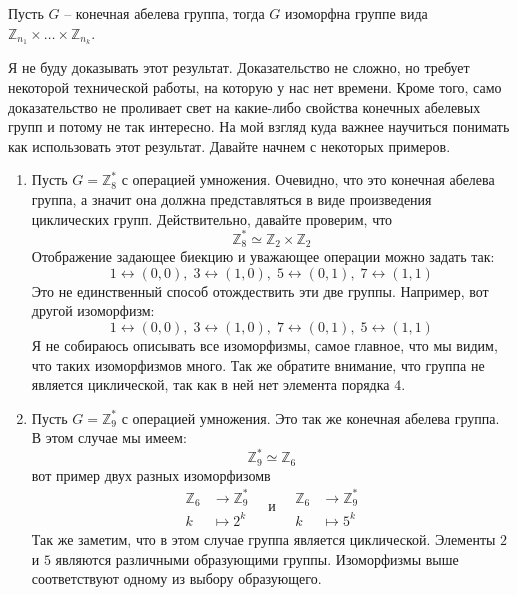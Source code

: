 \begin{claim}
\label{claim::FAGStruct}
Пусть $G$ -- конечная абелева группа, тогда $G$ изоморфна группе вида $\mathbb Z_{n_1}\times \ldots \times \mathbb Z_{n_k}$.
\end{claim}

Я не буду доказывать этот результат.
Доказательство не сложно, но требует некоторой технической работы, на которую у нас нет времени.
Кроме того, само доказательство не проливает свет на какие-либо свойства конечных абелевых групп и потому не так интересно.
На мой взгляд куда важнее научиться понимать как использовать этот результат.
Давайте начнем с некоторых примеров.

\begin{examples}
\begin{enumerate}
\item Пусть $G = \mathbb Z_8^*$ с операцией умножения.
Очевидно, что это конечная абелева группа, а значит она должна представляться в виде произведения циклических групп.
Действительно, давайте проверим, что
\[
\mathbb Z_8^* \simeq \mathbb Z_2\times \mathbb Z_2
\]
Отображение задающее биекцию и уважающее операции можно задать так:
\[
1 \leftrightarrow (0,0),\; 3 \leftrightarrow (1,0),\; 5\leftrightarrow(0,1),\;7\leftrightarrow(1,1)
\]
Это не единственный способ отождествить эти две группы.
Например, вот другой изоморфизм:
\[
1 \leftrightarrow (0,0),\; 3 \leftrightarrow (1,0),\; 7\leftrightarrow(0,1),\;5\leftrightarrow(1,1)
\]
Я не собираюсь описывать все изоморфизмы, самое главное, что мы видим, что таких изоморфизмов много.
Так же обратите внимание, что группа не является циклической, так как в ней нет элемента порядка $4$.

\item Пусть $G = \mathbb Z_9^*$ с операцией умножения.
Это так же конечная абелева группа.
В этом случае мы имеем:
\[
\mathbb Z_9^* \simeq \mathbb Z_6
\]
вот пример двух разных изоморфизомв
\[
\begin{aligned}
\mathbb Z_6 &\to \mathbb Z_9^*\\
k &\mapsto 2^k
\end{aligned}
\quad\text{и}\quad
\begin{aligned}
\mathbb Z_6 &\to \mathbb Z_9^*\\
k &\mapsto 5^k
\end{aligned}
\]
Так же заметим, что в этом случае группа является циклической.
Элементы $2$ и $5$ являются различными образующими группы.
Изоморфизмы выше соответствуют одному из выбору образующего.
\end{enumerate}
\end{examples}


